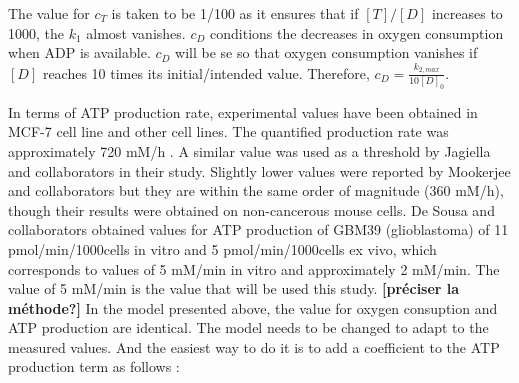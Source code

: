 \documentclass[11pt,a4paper]{article}
\begin{document}
%
%

The value for $c_T$ is taken to be 1/100 as it ensures that if $[T]/[D]$ increases to 1000, the $k_{1}$ almost vanishes. $c_D$ conditions the decreases in oxygen consumption when ADP is available. $c_D$ will be se so that oxygen consumption vanishes if $[D]$ reaches 10 times its initial/intended value. Therefore, $c_D = \frac{k_{2,max}}{10[D]_0}$. 

In terms of ATP production rate, experimental values have been obtained in MCF-7 cell line and other cell lines. The quantified production rate was approximately 720 mM/h \cite{RomeroAgilent}. A similar value was used as a threshold by Jagiella and collaborators in their study.\cite{Jagiella2016} Slightly lower values were reported by Mookerjee and collaborators but they are within the same order of magnitude (360 mM/h), though their results were obtained on non-cancerous mouse cells.\cite{Mookerjee2017}  De Sousa and collaborators obtained values for ATP production of GBM39 (glioblastoma) of  11 pmol/min/1000cells in vitro and 5 pmol/min/1000cells ex vivo, which corresponds to values of 5 mM/min in vitro and approximately 2 mM/min. The value of 5 mM/min is the value that will be used this study.\cite{DeSousa2022} \textbf{[préciser la méthode?]}
In the model presented above, the value for oxygen consuption and ATP production are identical. The model needs to be changed to adapt to the measured values. And the easiest way to do it is to add a coefficient to the ATP production term as follows :
\end{document}
